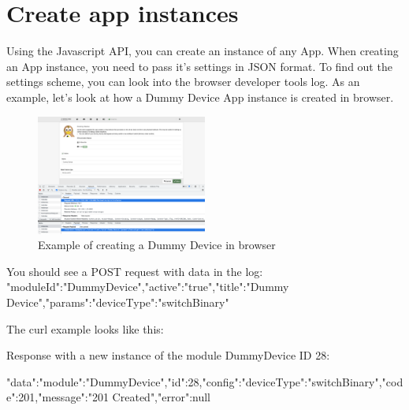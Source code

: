 \section{Create app instances}
\label{createappinstances}

Using the Javascript API, you can create an instance of any App. When creating an App instance, you need to pass it's settings in JSON format. To find out the settings scheme, you can look into the browser developer tools log. As an example, let's look at how a Dummy Device App instance is created in browser.

\begin{figure}
\begin{center}
\includegraphics[width=0.5\textwidth]{pngs/cap13/requst-api-dummy-device.png}
\caption{Example of creating a Dummy Device in browser}
\label{requst_api_dummy_device}
\end{center}
\end{figure}

You should see a POST request with data in the log: 
{"moduleId":"DummyDevice","active":"true","title":"Dummy Device","params":{"deviceType":"switchBinary"}}

The curl example looks like this:
{\scriptsize
\begin{quote} 
\end{quote}
}

Response with a new instance of the module DummyDevice ID 28:
\begin{listingverbatim}
{"data":{"module":"DummyDevice","id":28,"config":{"deviceType":"switchBinary"}},"code":201,"message":"201 Created","error":null}
\end{listingverbatim}

